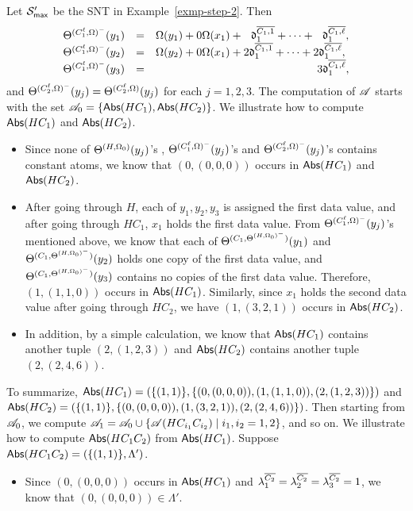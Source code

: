 \begin{example}\label{exmp-step-3}
Let ${\mathcal{S} }'_{\sf max}$ be the SNT in Example~\ref{exmp-step-2}. Then
\[
\begin{array}{l c l}
\sumf^{(C^\ell_1, \initval)^{-}}(y_1) &= & \initval(y_1) + 0 \initval(x_1) +\ \ \vard^{\circled{C_1, 1}}_1 + \dots +\ \ \vard^{\circled{C_1, \ell}}_1,\\
%
\sumf^{(C^\ell_1, \initval)^-}(y_2) &=& \initval(y_2) + 0 \initval(x_1) + 2 \vard^{\circled{C_1, 1}}_1 + \dots + 2 \vard^{\circled{C_1, \ell}}_1,\\
%
\sumf^{(C^\ell_1, \initval)^-}(y_3) &=& \hspace{5.1cm} 3 \vard^{\circled{C_1, \ell}}_1,
\end{array}
\] 
and $\Theta^{(C^\ell_2, \Omega)^-}(y_j) = \Theta^{(C^\ell_2, \Omega)}(y_j)$ for each $j=1,2,3$.
The computation of $\mathscr{A}$ starts with the set $\mathscr{A}_0 = \{\mathsf{Abs}(HC_1), \mathsf{Abs}(HC_2)\}$. We illustrate how to compute $\mathsf{Abs}(HC_1)$ and $\mathsf{Abs}(HC_2)$. 
\begin{itemize}
\item Since none of $\Theta^{(H, \Omega_0)}(y_j)$'s , $\Theta^{(C^\ell_1, \Omega)^{-}}(y_j)$'s and $\Theta^{(C^\ell_2, \Omega)^{-}}(y_j)$'s contains constant atoms, we know that $(0, (0,0,0))$ occurs in $\mathsf{Abs}(HC_1)$ and  $\mathsf{Abs}(HC_2)$. 
%
\item After going through $H$, each of $y_1,y_2,y_3$ is assigned the first data value, and after going through $HC_1$, $x_1$ holds the first data value. From $\Theta^{(C^\ell_1, \Omega)^{-}}(y_j)$'s mentioned above, we know that each of $\Theta^{(C_1, \Theta^{(H, \Omega_0)^{-}})}(y_1)$ and $\Theta^{(C_1, \Theta^{(H, \Omega_0)^{-}})}(y_2)$ holds one copy of the first data value,  and $\Theta^{(C_1, \Theta^{(H, \Omega_0)^{-}})}(y_3)$ contains no copies of the first data value. Therefore, $(1, (1,1,0))$ occurs in $\mathsf{Abs}(HC_1)$. Similarly, since $x_1$ holds the second data value after going through $HC_2$, we have $(1, (3, 2, 1))$ occurs in $\mathsf{Abs}(HC_2)$. 
%
\item In addition, by a simple calculation, we know that $\mathsf{Abs}(HC_1)$ contains another tuple $(2,(1, 2, 3))$ and $\mathsf{Abs}(HC_2)$ contains another tuple $(2, (2, 4, 6))$.
\end{itemize}
To summarize, $\mathsf{Abs}(HC_1)=(\{(1,1)\}, \{(0, (0,0,0)), (1, (1, 1, 0)), (2, (1, 2, 3))\})$ and $\mathsf{Abs}(HC_2) = (\{(1,1)\}, \{(0, (0, 0, 0)), (1, (3, 2,1)), (2, (2, 4, 6))\})$. Then starting from $\mathscr{A}_0$, we compute $\mathscr{A}_1 = \mathscr{A}_0 \cup \{\mathscr{A}(HC_{i_1}C_{i_2}) \mid i_1, i_2 = 1, 2\}$, and so on. We illustrate how to compute $\mathsf{Abs}(HC_1 C_2)$ from $\mathsf{Abs}(HC_1)$. Suppose $\mathsf{Abs}(HC_1C_2) = (\{(1,1)\}, \Lambda')$. 
\begin{itemize}
\item Since $(0, (0,0,0))$ occurs in $\mathsf{Abs}(HC_1)$ and $\lambda^{\overline{C_2}}_1 = \lambda^{\overline{C_2}}_2 = \lambda^{\overline{C_2}}_3 = 1$, we know that $(0, (0,0,0)) \in \Lambda'$.


\end{itemize}
\end{example}
